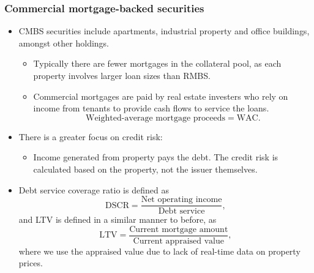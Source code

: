 \documentclass[../notes_compiled.tex]{subfiles}
\begin{document}
\subsubsection{Commercial mortgage-backed securities}
\begin{itemize}
\item CMBS securities include apartments, industrial property and office buildings, amongst other holdings.
\begin{itemize}
\item Typically there are fewer mortgages in the collateral pool, as each property involves larger loan sizes than RMBS.
\item Commercial mortgages are paid by real estate investers who rely on income from tenants to provide cash flows to service the loans.
\begin{equation}
\text{Weighted-average mortgage proceeds} = \text{WAC}.
\end{equation}
\end{itemize}
\item There is a greater focus on credit risk:
\begin{itemize}
\item Income generated from property pays the debt. The credit risk is calculated based on the property, not the issuer themselves.
\end{itemize}

\item Debt service coverage ratio is defined as
\begin{equation}
\text{DSCR} = \frac{\text{Net operating income}}{\text{Debt service}},
\end{equation}
and LTV is defined in a similar manner to before, as
\begin{equation}
\text{LTV} = \frac{\text{Current mortgage amount}}{\text{Current appraised value}},
\end{equation}
where we use the appraised value due to lack of real-time data on property prices.


\end{itemize}
\end{document}

